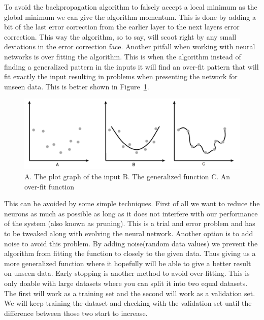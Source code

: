 To avoid the backpropagation algorithm to falsely accept a local minimum as the global minimum we can give the algorithm momentum. This is done by adding a bit of the last error correction from the earlier layer to the next layers error correction. This way the algorithm, so to say, will scoot right by any small deviations in the error correction face.
\newline
Another pitfall when working with neural networks is over fitting the algorithm. This is when the algorithm instead of finding a generalized pattern in the inputs it will find an over-fit pattern that will fit exactly the input resulting in problems when presenting the network for unseen data. This is better shown in Figure~\ref{fig:overfitting}.
\begin{figure}[!ht]
\centering
\includegraphics[width=0.8\linewidth,natwidth=1262,natheight=415]{billeder/overfitting.png}
\caption{A. The plot graph of the input B. The generalized function C. An over-fit function \cite[P. 319]{buckland2002ai}}
\label{fig:overfitting}
\end{figure}
This can be avoided by some simple techniques. First of all we want to reduce the neurons as much as possible as long as it does not interfere with our performance of the system (also known as pruning). This is a trial and error problem and has to be tweaked along with evolving the neural network. Another option is to add noise to avoid this problem. By adding noise(random data values) we prevent the algorithm from fitting the function to closely to the given data. Thus giving us a more generalized function where it hopefully will be able to give a better result on unseen data. Early stopping is another method to avoid over-fitting. This is only doable with large datasets where you can split it into two equal datasets. The first will work as a training set and the second will work as a validation set. We will keep training the dataset and checking with the validation set until the difference between those two start to increase.

